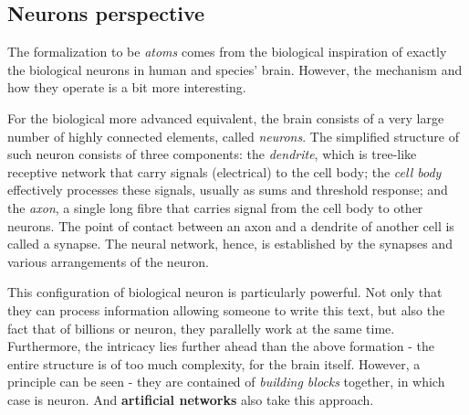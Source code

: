 %

\subsection{Neurons perspective}

The formalization to be \textit{atoms} comes from the biological inspiration of exactly the biological neurons in human and species' brain. However, the mechanism and how they operate is a bit more interesting. 

For the biological more advanced equivalent, the brain consists of a very large number of highly connected elements, called \textit{neurons}. The simplified structure of such neuron consists of three components: the \textit{dendrite}, which is tree-like receptive network that carry signals (electrical) to the cell body; the \textit{cell body} effectively processes these signals, usually as sums and threshold response; and the \textit{axon}, a single long fibre that carries signal from the cell body to other neurons. The point of contact between an axon and a dendrite of another cell is called a synapse. The neural network, hence, is established by the synapses and various arrangements of the neuron. 

This configuration of biological neuron is particularly powerful. Not only that they can process information allowing someone to write this text, but also the fact that of billions or neuron, they parallelly work at the same time. Furthermore, the intricacy lies further ahead than the above formation - the entire structure is of too much complexity, for the brain itself. However, a principle can be seen - they are contained of \textit{building blocks} together, in which case is neuron. And \textbf{artificial networks} also take this approach. 

